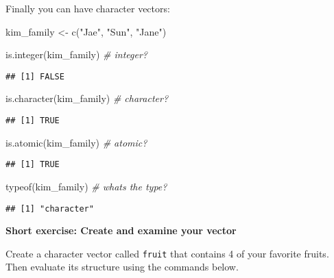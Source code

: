 \documentclass[
]{book}
\newenvironment{Shaded}{\begin{snugshade}}{\end{snugshade}}
\newcommand{\CommentTok}[1]{\textcolor[rgb]{0.56,0.35,0.01}{\textit{#1}}}
\newcommand{\FunctionTok}[1]{\textcolor[rgb]{0.00,0.00,0.00}{#1}}
\newcommand{\NormalTok}[1]{#1}
\newcommand{\OtherTok}[1]{\textcolor[rgb]{0.56,0.35,0.01}{#1}}
\newcommand{\StringTok}[1]{\textcolor[rgb]{0.31,0.60,0.02}{#1}}
\begin{document}
Finally you can have character vectors:

\begin{Shaded}
\begin{Highlighting}[]
\NormalTok{kim\_family }\OtherTok{\textless{}{-}} \FunctionTok{c}\NormalTok{(}\StringTok{"Jae"}\NormalTok{, }\StringTok{"Sun"}\NormalTok{, }\StringTok{"Jane"}\NormalTok{)}

\FunctionTok{is.integer}\NormalTok{(kim\_family) }\CommentTok{\# integer?}
\end{Highlighting}
\end{Shaded}

\begin{verbatim}
## [1] FALSE
\end{verbatim}

\begin{Shaded}
\begin{Highlighting}[]
\FunctionTok{is.character}\NormalTok{(kim\_family) }\CommentTok{\# character?}
\end{Highlighting}
\end{Shaded}

\begin{verbatim}
## [1] TRUE
\end{verbatim}

\begin{Shaded}
\begin{Highlighting}[]
\FunctionTok{is.atomic}\NormalTok{(kim\_family) }\CommentTok{\# atomic?}
\end{Highlighting}
\end{Shaded}

\begin{verbatim}
## [1] TRUE
\end{verbatim}

\begin{Shaded}
\begin{Highlighting}[]
\FunctionTok{typeof}\NormalTok{(kim\_family) }\CommentTok{\# what\textquotesingle{}s the type?}
\end{Highlighting}
\end{Shaded}

\begin{verbatim}
## [1] "character"
\end{verbatim}

\textbf{Short exercise: Create and examine your vector}

Create a character vector called \texttt{fruit} that contains 4 of your favorite fruits. Then evaluate its structure using the commands below.
\end{document}
